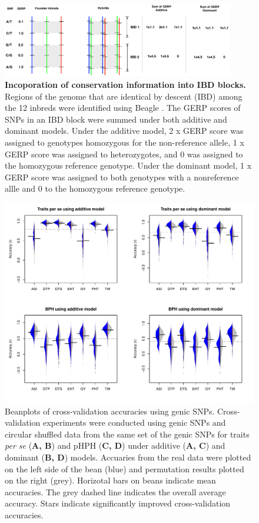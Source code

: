 \documentclass[9pt,twocolumn,twoside]{gsajnl}
\begin{document}
\begin{figure}[here]
\includegraphics[width=0.9\textwidth]{SFig_gerpIBD.pdf}
\caption{
\textbf{Incoporation of conservation information into IBD blocks.}
Regions of the genome that are identical by descent (IBD) among the 12 inbreds were identified using Beagle \citep{Browning2009}.  The GERP scores of SNPs in an IBD block were summed under both additive and dominant models. Under the additive model, 2 x GERP score was assigned to genotypes homozygous for the non-reference allele, 1 x GERP score was assigned to heterozygotes, and 0 was assigned to the homozygous reference genotype. Under the dominant model, 1 x GERP score was assigned to both genotypes with a nonreference allle and 0 to the homozygous reference genotype.}
\label{fig:gerpibd}
\end{figure}

\begin{figure}[htbp]
\centering
\includegraphics[width=\linewidth]{SFig_genicsnp.pdf}
\caption{Beanplots of cross-validation accuracies using genic SNPs. Cross-validation experiments were conducted using genic SNPs and circular shuffled data from the same set of the genic SNPs for traits \emph{per se} (\textbf{A, B}) and pHPH (\textbf{C, D}) under additive (\textbf{A, C}) and dominant (\textbf{B, D}) models. Accuaries from the real data were plotted on the left side of the bean (blue) and permutation results plotted on the right (grey). Horizotal bars on beans indicate mean accuracies. The grey dashed line indicates the overall average accuracy. Stars indicate significantly improved cross-validation accuracies.}
\label{fig:genicsnp}
\end{figure}
\end{document}
